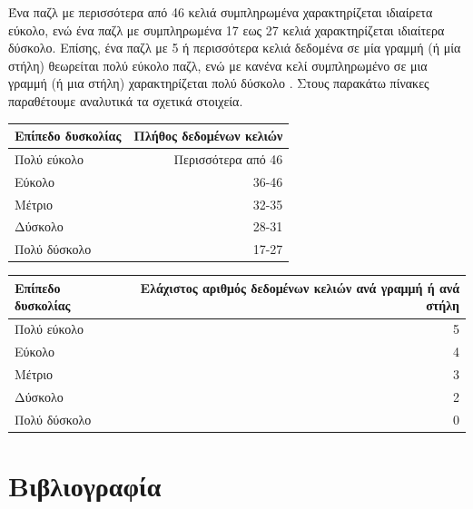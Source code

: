 \documentclass[12pt]{book}
\theoremstyle{definition}
\begin{document}
Ένα παζλ με περισσότερα από 46 κελιά συμπληρωμένα χαρακτηρίζεται ιδιαίρετα εύκολο, ενώ ένα παζλ με συμπληρωμένα 17 εως 27 κελιά χαρακτηρίζεται ιδιαίτερα δύσκολο. Επίσης, ένα παζλ με 5 ή περισσότερα κελιά δεδομένα σε μία γραμμή (ή μία στήλη) θεωρείται πολύ εύκολο παζλ, ενώ με κανένα κελί συμπληρωμένο σε μια γραμμή (ή μια στήλη) χαρακτηρίζεται πολύ δύσκολο \cite{10}. Στους παρακάτω πίνακες παραθέτουμε αναλυτικά τα σχετικά στοιχεία. \par

\begin{center}
	\begin{tabular}{ | l | r | }
		\hline
		Επίπεδο δυσκολίας & Πλήθος δεδομένων κελιών \\

		\hline
		Πολύ εύκολο & Περισσότερα από 46  \\
		\hline
		Εύκολο & 36-46  \\
		\hline
		Μέτριο & 32-35  \\
		\hline
		Δύσκολο & 28-31  \\
		\hline
		Πολύ δύσκολο & 17-27  \\
		\hline
	\end{tabular}
\end{center}

\begin{center}
	\begin{tabular}{ | l | r | }
		\hline
		Επίπεδο δυσκολίας & Ελάχιστος αριθμός δεδομένων κελιών ανά γραμμή ή ανά στήλη \\

		\hline
		Πολύ εύκολο & 5  \\
		\hline
		Εύκολο & 4  \\
		\hline
		Μέτριο & 3  \\
		\hline
		Δύσκολο & 2  \\
		\hline
		Πολύ δύσκολο & 0  \\
		\hline
	\end{tabular}
\end{center}




\chapter{Βιβλιογραφία}
\end{document}
